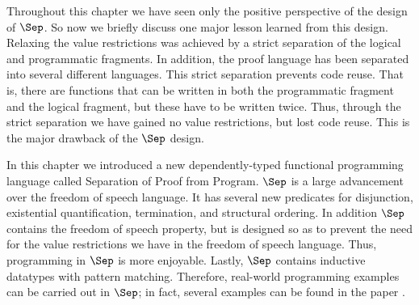 Throughout this chapter we have seen only the positive perspective of
the design of $\Sep$.  So now we briefly discuss one major lesson
learned from this design.  Relaxing the value restrictions was
achieved by a strict separation of the logical and programmatic
fragments.  In addition, the proof language has been separated into
several different languages.  This strict separation prevents code
reuse.  That is, there are functions that can be written in both the
programmatic fragment and the logical fragment, but these have to be
written twice.  Thus, through the strict separation we have gained no
value restrictions, but lost code reuse.  This is the major drawback
of the $\Sep$ design.  

In this chapter we introduced a new dependently-typed functional
programming language called Separation of Proof from Program.  $\Sep$
is a large advancement over the freedom of speech language.  It has
several new predicates for disjunction, existential quantification,
termination, and structural ordering.  In addition $\Sep$ contains the
freedom of speech property, but is designed so as to prevent the need
for the value restrictions we have in the freedom of speech language.
Thus, programming in $\Sep$ is more enjoyable.  Lastly, $\Sep$
contains inductive datatypes with pattern matching.  Therefore,
real-world programming examples can be carried out in $\Sep$; in fact,
several examples can be found in the paper \cite{Kimmel:2012}.

